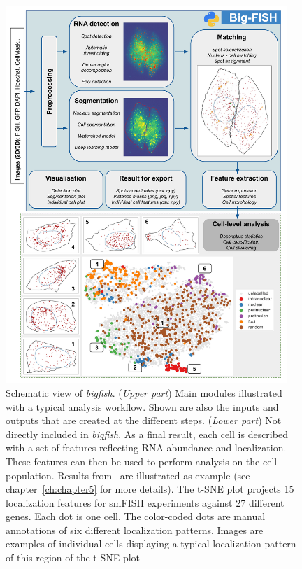 \begin{figure}[]
    \centering
    \includegraphics[width=0.95\textwidth]{figures/chapter1/schema_bigfish_full}
    \caption[Schematic view of \emph{bigfish}]{Schematic view of \emph{bigfish}.
	(\textit{Upper part}) Main modules illustrated with a typical analysis workflow.
	Shown are also the inputs and outputs that are created at the different steps.
	(\textit{Lower part}) Not directly included in \emph{bigfish}.
	As a final result, each cell is described with a set of features reflecting RNA abundance and localization.
	These features can then be used to perform analysis on the cell population.
	Results from~\cite{CHOUAIB_2020} are illustrated as example (see chapter~\ref{ch:chapter5} for more details).
	The t-SNE plot projects 15 localization features for smFISH experiments against 27 different genes.
	Each dot is one cell.
	The color-coded dots are manual annotations of six different localization patterns.
	Images are examples of individual cells displaying a typical localization pattern of this region of the t-SNE plot}
    \label{fig:bigfish}
\end{figure}

